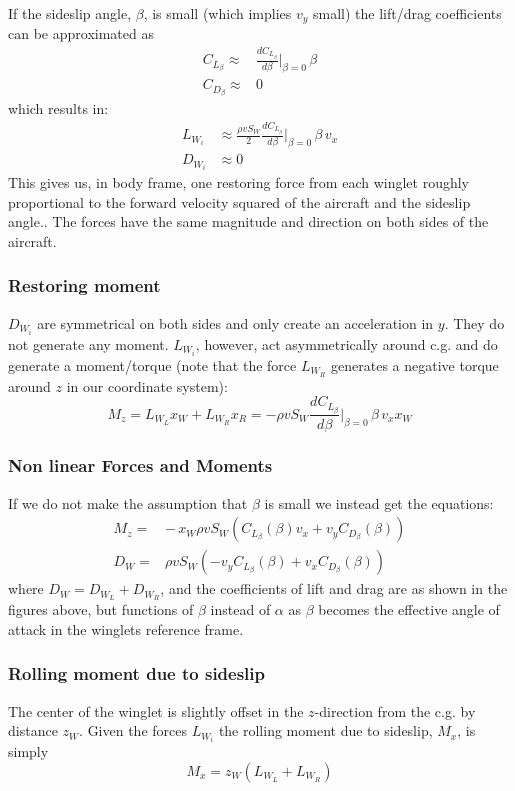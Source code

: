 If the sideslip angle, $\beta$, is small (which implies $v_y$ small) the lift/drag coefficients can be approximated as 
\begin{equation}\begin{split}
    C_{L_\beta} \approx& \frac{d C_{L_\beta}}{d \beta} \big\vert_{\beta=0} \, \beta \\
    C_{D_\beta} \approx& 0
\end{split}\end{equation}
which results in:
\begin{equation}\begin{split}
L_{W_i} &\approx 
    \frac{\rho v S_W}{2} \frac{d C_{L_\beta}}{d \beta} \big\vert_{\beta=0} \, \beta \, v_x  \\
%
D_{W_i} &\approx 0
\end{split}\end{equation}
This gives us, in body frame, one restoring force from each winglet roughly proportional to the forward velocity squared of the aircraft and the sideslip angle..
The forces have the same magnitude and direction on both sides of the aircraft.



\subsubsection{Restoring moment}

$D_{W_i}$ are symmetrical on both sides and only create an acceleration in $y$.
They do not generate any moment.
$L_{W_i}$, however, act asymmetrically around c.g. and do generate a moment/torque (note that the force $L_{W_R}$ generates a negative torque around $z$ in our coordinate system):
\begin{equation}
    M_z = L_{W_L} x_W + L_{W_R} x_R = - \rho v S_W \frac{d C_{L_\beta}}{d \beta} \big\vert_{\beta=0} \, \beta \, v_x x_W
\end{equation}

\subsubsection{Non linear Forces and Moments}
If we do not make the assumption that $\beta$ is small we instead get the equations:
\begin{equation}\begin{split}
    M_z =& - \, x_W \rho v S_W  \left( C_{L_\beta}(\beta) v_x + v_y C_{D_\beta}(\beta) \right) \\
    D_{W} =& \rho v S_W \left(-v_y C_{L_\beta}(\beta) + v_x C_{D_\beta}(\beta) \right)
\end{split}\end{equation}
where $D_W = D_{W_L} + D_{W_R}$, and the coefficients of lift and drag are as shown in the figures above, but functions of $\beta$ instead of $\alpha$ as $\beta$ becomes the effective angle of attack in the winglets reference frame.



\subsubsection{Rolling moment due to sideslip}

The center of the winglet is slightly offset in the $z$-direction from the c.g. by distance $z_W$. 
Given the forces $L_{W_i}$ the rolling moment due to sideslip, $M_x$, is simply
\begin{equation}
    M_x = z_W (L_{W_L} + L_{W_R})
\end{equation}

